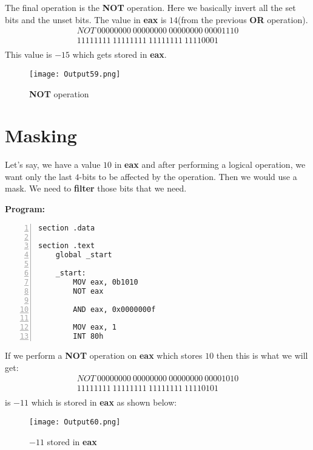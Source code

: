 \documentclass{article}
\makeatletter
\renewcommand\paragraph{\@startsection{paragraph}{4}{\z@}{-3.25ex \@plus -1ex \@minus -.2ex}{1.5ex \@plus .2ex}{\normalfont\normalsize\bfseries}}
\makeatother
\begin{document}
The final operation is the \textbf{NOT} operation. Here we basically invert all the set bits and the unset bits. The value in \textbf{eax} is $14$(from the previous \textbf{OR} operation).
\begin{align*}
NOT\ 00000000\ 00000000\ 00000000\ 00001110 \\
\hline
11111111\ 11111111\ 11111111\ 11110001 \\
\end{align*}
This value is $-15$ which gets stored in \textbf{eax}.
\begin{figure}[h]
\centering
\texttt{[image: Output59.png]}
\caption{\textbf{NOT} operation}
\label{fig:fig3}
\end{figure}

\newpage
\section{Masking}\label{sec:sec2}
\paragraph{}
Let's say, we have a value $10$ in \textbf{eax} and after performing a logical operation, we want only the last $4$-bits to be affected by the operation. Then we would use a mask. We need to \textbf{filter} those bits that we need.

\textbf{Program:}
\begin{Verbatim}[numbers=left, frame=single]
section .data

section .text
	global _start
	
	_start:
		MOV eax, 0b1010
		NOT eax
		
		AND eax, 0x0000000f
		
		MOV eax, 1
		INT 80h
\end{Verbatim}

If we perform a \textbf{NOT} operation on \textbf{eax} which stores $10$ then this is what we will get:
\begin{align*}
NOT\ 00000000\ 00000000\ 00000000\ 00001010 \\
\hline
11111111\ 11111111\ 11111111\ 11110101 \\
\end{align*}
is $-11$ which is stored in \textbf{eax} as shown below:
\begin{figure}[h]
\centering
\texttt{[image: Output60.png]}
\caption{$-11$ stored in \textbf{eax}}
\label{fig:fig4}
\end{figure}
\end{document}
